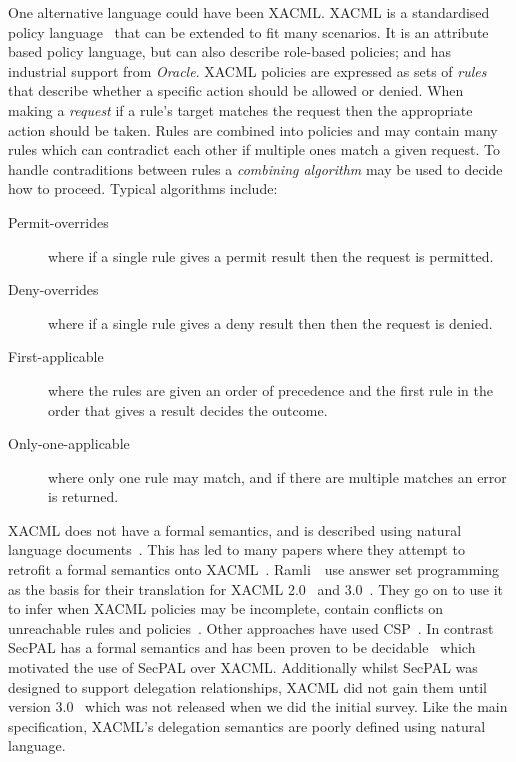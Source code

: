 \documentclass[thesis.tex]{subfiles}
\begin{document}
One alternative language could have been XACML.  
XACML is a standardised policy language~\cite{oasis_extensible_2013} that can be extended to fit many scenarios.  
It is an attribute based policy language, but can also describe role-based policies; and has industrial support from \emph{Oracle}.
XACML policies are expressed as sets of \emph{rules} that describe whether a specific action should be allowed or denied.
When making a \emph{request} if a rule's target matches the request then the appropriate action should be taken.
Rules are combined into policies and may contain many rules which can contradict each other if multiple ones match a given request.
To handle contraditions between rules a \emph{combining algorithm} may be used to decide how to proceed.
Typical algorithms include:
\begin{description}
  \item[Permit-overrides] where if a single rule gives a permit result then the request is permitted.
  \item[Deny-overrides] where if a single rule gives a deny result then then the request is denied.
  \item[First-applicable] where the rules are given an order of precedence and the first rule in the order that gives a result decides the outcome.
  \item[Only-one-applicable] where only one rule may match, and if there are multiple matches an error is returned.
\end{description}

XACML does not have a formal semantics, and is described using natural language documents~\cite{oasis_extensible_2013}. This has led to many papers where they attempt to retrofit a formal semantics onto XACML~\cite{masi_formalisation_2012}.  Ramli~\etal~use answer set programming as the basis for their translation for XACML 2.0~\cite{ramli_xacml_2012} and 3.0~\cite{ramli_logic_2014}.  They go on to use it to infer when XACML policies may be incomplete, contain conflicts on unreachable rules and policies~\cite{ramli_detecting_2015}. Other approaches have used CSP~\cite{bryans_reasoning_2005}.  In contrast SecPAL has a formal semantics and has been proven to be decidable~\cite{becker_secpal:_2010} which motivated the use of SecPAL over XACML.  Additionally whilst SecPAL was designed to support delegation relationships, XACML did not gain them until version 3.0~\cite{oasis_xacml_2010} which was not released when we did the initial survey.  Like the main specification, XACML's delegation semantics are poorly defined using natural language.
\end{document}
